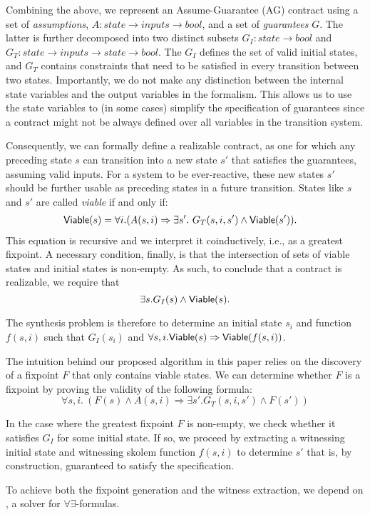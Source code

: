 Combining the above, we represent an Assume-Guarantee (AG) contract using a set
of \emph{assumptions}, $A: state \rightarrow inputs \rightarrow bool$,
and a set of \emph{guarantees} $G$. The latter is further decomposed into two
distinct subsets $G_I: state \rightarrow bool$ and $G_T: state \rightarrow
inputs \rightarrow state \rightarrow bool$. The $G_I$ defines the set of valid
initial states, and $G_T$ contains constraints that need to be satisfied in
every transition between two states. Importantly, we
do not make any distinction between the internal state variables and the output variables in the
formalism. This allows us to use the state variables to (in some cases)
simplify the specification of guarantees since a contract
might not be always defined over all variables in the transition system.

Consequently, we can formally define a realizable contract, as one for which any
preceding state $s$ can  transition into a new state $s'$ that satisfies
the guarantees, assuming valid inputs. For a system to be ever-reactive, these
new states $s'$ should be further usable as preceding states in a future
transition. States like $s$ and $s'$ are called \textit{viable} if
and only if:
\begin{align}
\begin{split}
  {\mathsf {Viable}}(s) &=
  \forall i. (A(s, i) \Rightarrow \exists s'.~ G_T(s, i,s')
\land {\mathsf {Viable}}(s')).
\label{eq:viable}
\end{split}
\end{align}
This equation is recursive and we interpret it coinductively, i.e., as a
greatest fixpoint.
A necessary condition, finally, is that the intersection of sets of viable states
and initial states is non-empty. As such, to conclude that a contract
is realizable, we require that
\begin{equation}
\exists s. G_I(s) \land {\mathsf {Viable}}(s).
\label{eq:nonempty}
\end{equation}

\noindent The synthesis problem is therefore to determine an initial state $s_i$ and function $f(s, i)$ such that $G_I(s_i)$ and $\forall s, i . {\mathsf {Viable}}(s) \Rightarrow {\mathsf {Viable}}(f(s, i))$.

The intuition behind our proposed algorithm in this paper relies on the
discovery of a fixpoint $F$ that only contains viable states.  We can determine whether $F$ is a fixpoint by proving the validity of the following formula:
\[
\forall s,i. \ (F(s) \land A(s,i) \Rightarrow \exists s'.G_{T}(s,i,s') \land F(s'))
\]

\noindent In the case where the greatest fixpoint $F$ is non-empty, we check whether it satisfies $G_{I}$ for some initial state.  If so, we proceed by extracting a witnessing initial state and witnessing skolem function $f(s, i)$ to determine $s'$ that is, by construction, guaranteed to satisfy the specification.

To achieve both the fixpoint generation and the witness extraction, we depend on \aeval, a solver for $\forall\exists$-formulas.


